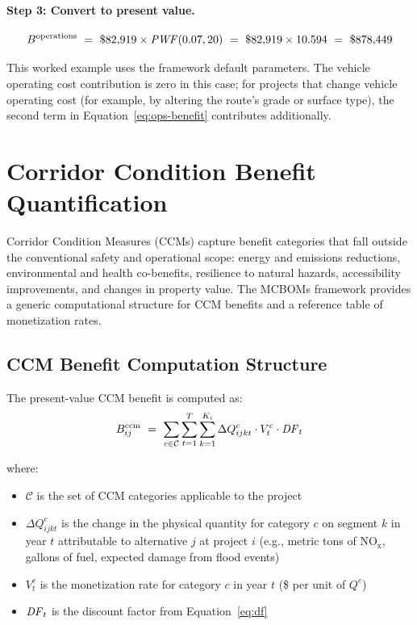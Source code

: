 \paragraph{Step 3: Convert to present value.}
\begin{equation*}
B^{\mathrm{operations}} \ =\ \$82{,}919 \times \mathit{PWF}(0.07, 20) \ =\ \$82{,}919 \times 10.594 \ =\ \$878{,}449
\end{equation*}

This worked example uses the framework default parameters. The vehicle operating
cost contribution is zero in this case; for projects that change vehicle
operating cost (for example, by altering the route's grade or surface type),
the second term in Equation~\ref{eq:ops-benefit} contributes additionally.

\section{Corridor Condition Benefit Quantification}
\label{sec:ccm}

Corridor Condition Measures (CCMs) capture benefit categories that fall
outside the conventional safety and operational scope: energy and emissions
reductions, environmental and health co-benefits, resilience to natural
hazards, accessibility improvements, and changes in property value. The
MCBOMs framework provides a generic computational structure for CCM benefits
and a reference table of monetization rates.

\subsection{CCM Benefit Computation Structure}

The present-value CCM benefit is computed as:
\begin{equation}
B^{\mathrm{ccm}}_{ij}\ =\ \sum_{c \in \mathcal{C}} \sum_{t=1}^{T} \sum_{k=1}^{K_i}
  \Delta Q_{ijkt}^{c} \cdot V_t^{c} \cdot \mathit{DF}_t
\label{eq:ccm-benefit}
\end{equation}

\noindent where:
\begin{itemize}[leftmargin=2em, itemsep=2pt]
  \item $\mathcal{C}$ is the set of CCM categories applicable to the project
  \item $\Delta Q_{ijkt}^{c}$ is the change in the physical quantity for
    category $c$ on segment $k$ in year $t$ attributable to alternative $j$
    at project $i$ (e.g., metric tons of $\mathrm{NO_x}$, gallons of fuel,
    expected damage from flood events)
  \item $V_t^{c}$ is the monetization rate for category $c$ in year $t$
    (\$ per unit of $Q^c$)
  \item $\mathit{DF}_t$ is the discount factor from Equation~\ref{eq:df}
\end{itemize}

